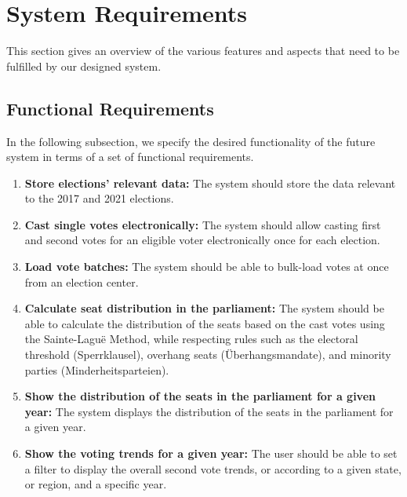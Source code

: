 \documentclass[a4paper]{article}
\begin{document}
\section{System Requirements}
This section gives an overview of the various features and aspects that need to be fulfilled by our designed system.
\subsection{Functional Requirements}
In the following subsection, we specify the desired functionality of the future system in terms of a set of functional requirements.

\begin{enumerate}[leftmargin=*,labelindent=16pt,label=\bfseries FR\arabic*. \hspace{0.1cm}]


  \item \textbf{Store elections' relevant data:} The system should store the data relevant to the 2017 and 2021 elections.

  \item \textbf{Cast single votes electronically:} The system should allow casting first and second votes for an eligible voter electronically once for each election.

  \item \textbf{Load vote batches:} The system should be able to bulk-load votes at once from an election center.

  \item \textbf{Calculate seat distribution in the parliament:} The system should be able to calculate the distribution of the seats based on the cast votes using the Sainte-Lagu\"{e} Method, while respecting rules such as the electoral threshold (Sperrklausel), overhang seats (Überhangsmandate), and minority parties (Minderheitsparteien).

  \item \textbf{Show the distribution of the seats in the parliament for a given year:} The system displays the distribution of the seats in the parliament for a given year.


  \item \textbf{Show the voting trends for a given year:} The user should be able to set a filter to display the overall second vote trends, or according to a given state, or region, and a specific year.



\end{enumerate}
\end{document}
